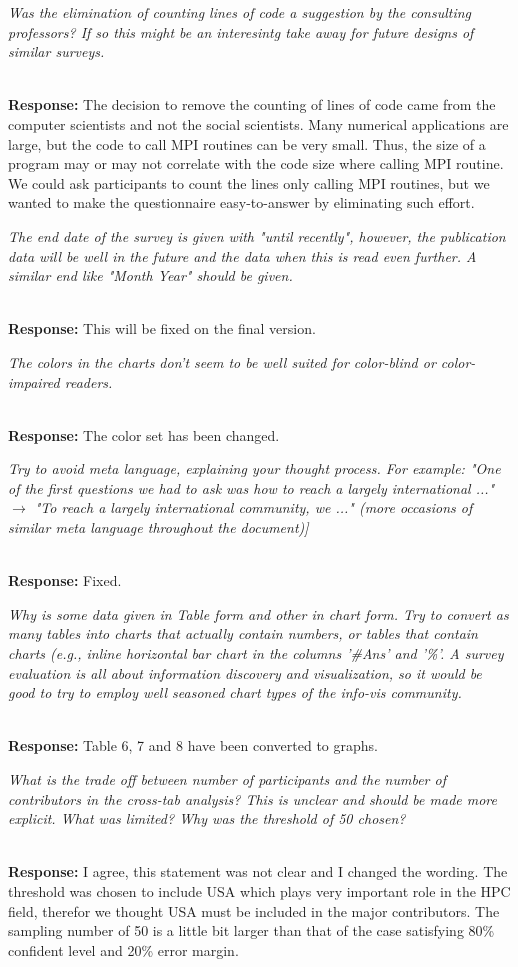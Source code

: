 \documentclass[11pt]{article}
\newcommand{\iresponse}[2]{{\item \em #1}\\%
  {\bf Response:} #2}
\begin{document}
\begin{enumerate}
\iresponse{Was the elimination of counting lines of code a suggestion
  by the consulting professors? If so this might be an interesintg
  take away for future designs of similar surveys.}
{
The decision to remove the counting of lines of code came from the
computer scientists and not the social scientists.
Many numerical applications are large, but the
code to call MPI routines can be very small. Thus, the size of a
program may or may not correlate with the code size where calling MPI
routine. We could ask participants to count the lines only calling MPI
routines, but we wanted to make the questionnaire easy-to-answer by
eliminating such effort.
}

\iresponse{The end date of the survey is given with "until recently",
  however, the publication data will be well in the future and the
  data when this is read even further. A similar end like "Month Year"
  should be given.}
{This will be fixed on the final version.}

\iresponse{The colors in the charts don't seem to be well suited for
  color-blind or color-impaired readers.}
{The color set has been changed.}

\iresponse{Try to avoid meta language, explaining your thought
  process. For example: "One of the first questions we had to ask was
  how to reach a largely international ..."  $\to$ "To reach a largely
  international community, we ..." (more occasions of similar meta
  language throughout the document)]}
{Fixed.}

\iresponse{Why is some data given in Table form and other in chart
  form. Try to convert as many tables into charts that actually
  contain numbers, or tables that contain charts (e.g., inline
  horizontal bar chart in the columns '\#Ans' and '\%'. A survey
  evaluation is all about information discovery and visualization, so
  it would be good to try to employ well seasoned chart types of the
  info-vis community.}
{Table 6, 7 and 8 have been converted to graphs.}

\iresponse{What is the trade off between number of participants and
  the number of contributors in the cross-tab analysis? This is
  unclear and should be made more explicit. What was limited? Why was
  the threshold of 50 chosen?}
{I agree, this statement was not
  clear and I changed the wording.  The threshold was chosen to
  include USA which plays very important role in the HPC field,
  therefor we thought USA must be included in the major
  contributors. The sampling number of 50 is a little bit larger than
  that of the case satisfying 80\% confident level and 20\% error
  margin.} 


\end{enumerate}
\end{document}
